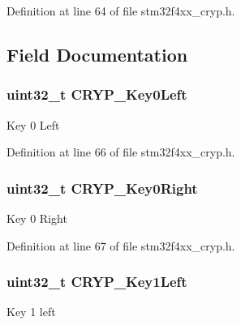 Definition at line 64 of file stm32f4xx\-\_\-cryp.\-h.



\subsection{Field Documentation}
\hypertarget{struct_c_r_y_p___key_init_type_def_a54f07204c4708d9704997be2b489a4b4}{
\subsubsection[{C\-R\-Y\-P\-\_\-\-Key0\-Left}]{\setlength{\rightskip}{0pt plus 5cm}uint32\-\_\-t C\-R\-Y\-P\-\_\-\-Key0\-Left}}\label{struct_c_r_y_p___key_init_type_def_a54f07204c4708d9704997be2b489a4b4}
Key 0 Left 

Definition at line 66 of file stm32f4xx\-\_\-cryp.\-h.

\hypertarget{struct_c_r_y_p___key_init_type_def_a03039088b171c114f907971e0e2246eb}{
\subsubsection[{C\-R\-Y\-P\-\_\-\-Key0\-Right}]{\setlength{\rightskip}{0pt plus 5cm}uint32\-\_\-t C\-R\-Y\-P\-\_\-\-Key0\-Right}}\label{struct_c_r_y_p___key_init_type_def_a03039088b171c114f907971e0e2246eb}
Key 0 Right 

Definition at line 67 of file stm32f4xx\-\_\-cryp.\-h.

\hypertarget{struct_c_r_y_p___key_init_type_def_aeb4a4df9faa0da133ddc0bf0523bcb30}{
\subsubsection[{C\-R\-Y\-P\-\_\-\-Key1\-Left}]{\setlength{\rightskip}{0pt plus 5cm}uint32\-\_\-t C\-R\-Y\-P\-\_\-\-Key1\-Left}}\label{struct_c_r_y_p___key_init_type_def_aeb4a4df9faa0da133ddc0bf0523bcb30}
Key 1 left 

